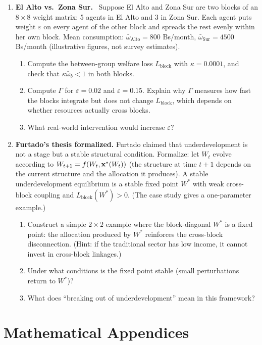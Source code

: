 \documentclass[../structural_economics_book.tex]{subfiles}
\begin{document}
\begin{enumerate}[label=\textbf{2.\arabic*}, leftmargin=3em]
\item \textbf{El Alto vs.\ Zona Sur.} \illustrative\ Suppose El Alto and Zona Sur are two blocks of an $8 \times 8$ weight matrix: 5 agents in El Alto and 3 in Zona Sur. Each agent puts weight $\varepsilon$ on every agent of the other block and spreads the rest evenly within her own block. Mean consumption: $\bar{\omega}_{\text{Alto}} = 800$ Bs/month, $\bar{\omega}_{\text{Sur}} = 4500$ Bs/month (illustrative figures, not survey estimates).
\begin{enumerate}
\item Compute the between-group welfare loss $L_{\text{block}}$ with $\kappa = 0.0001$, and check that $\kappa\bar\omega_b < 1$ in both blocks.
\item Compute $\Gamma$ for $\varepsilon = 0.02$ and $\varepsilon = 0.15$. Explain why $\Gamma$ measures how fast the blocks integrate but does not change $L_{\text{block}}$, which depends on whether resources actually cross blocks.
\item What real-world intervention would increase $\varepsilon$?
\end{enumerate}

\item \textbf{Furtado's thesis formalized.} Furtado claimed that underdevelopment is not a stage but a stable structural condition. Formalize: let $W_t$ evolve according to $W_{t+1} = f(W_t, \mathbf{x}^*(W_t))$ (the structure at time $t+1$ depends on the current structure and the allocation it produces). A stable underdevelopment equilibrium is a stable fixed point $W^*$ with weak cross-block coupling and $L_{\text{block}}(W^*) > 0$. (The case study gives a one-parameter example.)
\begin{enumerate}
\item Construct a simple $2 \times 2$ example where the block-diagonal $W^*$ is a fixed point: the allocation produced by $W^*$ reinforces the cross-block disconnection. (Hint: if the traditional sector has low income, it cannot invest in cross-block linkages.)
\item Under what conditions is the fixed point stable (small perturbations return to $W^*$)?
\item What does ``breaking out of underdevelopment'' mean in this framework?
\end{enumerate}
\end{enumerate}


\newpage
\section*{Mathematical Appendices}
\end{document}
